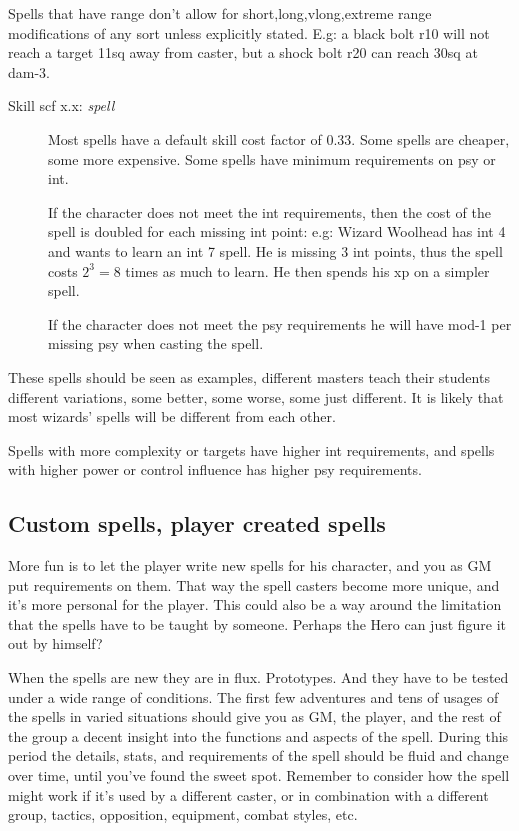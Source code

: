 Spells that have range don't allow for short,long,vlong,extreme range modifications of any sort unless explicitly stated. E.g: a black bolt r10 will not reach a target 11sq away from caster, but a shock bolt r20 can reach 30sq at dam-3.


\begin{description}

\item[Skill scf x.x: \emph{spell}] Most spells have a default skill cost factor of 0.33. Some spells are cheaper, some more expensive. Some spells have minimum requirements on psy or int. 

If the character does not meet the int requirements, then the cost of the spell is doubled for each missing int point: e.g: Wizard Woolhead has int 4 and wants to learn an int 7 spell. He is missing 3 int points, thus the spell costs $2^3=8$ times as much to learn. He then spends his xp on a simpler spell.

If the character does not meet the psy requirements he will have mod-1 per missing psy when casting the spell.

\end{description}

These spells should be seen as examples, different masters teach their students different variations, some better, some worse, some just different. It is likely that most wizards' spells will be different from each other.

Spells with more complexity or targets have higher int requirements, and spells with higher power or control influence has higher psy requirements.


\subsection*{Custom spells, player created spells}
More fun is to let the player write new spells for his character, and you as GM put requirements on them. That way the spell casters become more unique, and it's more personal for the player. This could also be a way around the limitation that the spells have to be taught by someone. Perhaps the Hero can just figure it out by himself?

When the spells are new they are in flux. Prototypes. And they have to be tested under a wide range of conditions. The first few adventures and tens of usages of the spells in varied situations should give you as GM, the player, and the rest of the group a decent insight into the functions and aspects of the spell. During this period the details, stats, and requirements of the spell should be fluid and change over time, until you've found the sweet spot. Remember to consider how the spell might work if it's used by a different caster, or in combination with a different group, tactics, opposition, equipment, combat styles, etc.






